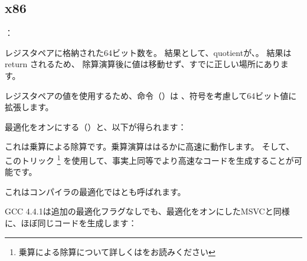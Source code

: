 ﻿\subsection{x86}

：




レジスタペアに格納された64ビット数を。
結果として、\gls{quotient}が、。
結果は return されるため、
除算演算後に値は移動せず、すでに正しい場所にあります。

レジスタペアの値を使用するため、命令（）は
、符号を考慮して64ビット値に拡張します。

最適化をオンにする（\Ox）と、以下が得られます：



これは乗算による除算です。乗算演算ははるかに高速に動作します。
そして、このトリック
\footnote{乗算による除算について詳しくはをお読みください}
を使用して、事実上同等でより高速なコードを生成することが可能です。

これはコンパイラの最適化ではとも呼ばれます。

GCC 4.4.1は追加の最適化フラグなしでも、最適化をオンにしたMSVCと同様に、ほぼ同じコードを生成します：

